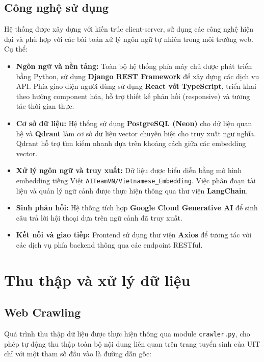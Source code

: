 \subsection{Công nghệ sử dụng}

Hệ thống được xây dựng với kiến trúc client-server, sử dụng các công nghệ hiện đại và phù hợp với các bài toán xử lý ngôn ngữ tự nhiên trong môi trường web. Cụ thể:

\begin{itemize}
    \item \textbf{Ngôn ngữ và nền tảng:} Toàn bộ hệ thống phía máy chủ được phát triển bằng Python, sử dụng \textbf{Django REST Framework} để xây dựng các dịch vụ API. Phía giao diện người dùng sử dụng \textbf{React với TypeScript}, triển khai theo hướng component hóa, hỗ trợ thiết kế phản hồi (responsive) và tương tác thời gian thực.

    \item \textbf{Cơ sở dữ liệu:} Hệ thống sử dụng \textbf{PostgreSQL (Neon)} cho dữ liệu quan hệ và \textbf{Qdrant} làm cơ sở dữ liệu vector chuyên biệt cho truy xuất ngữ nghĩa. Qdrant hỗ trợ tìm kiếm nhanh dựa trên khoảng cách giữa các embedding vector.

    \item \textbf{Xử lý ngôn ngữ và truy xuất:} Dữ liệu được biểu diễn bằng mô hình embedding tiếng Việt \texttt{AITeamVN/Vietnamese\_Embedding}. Việc phân đoạn tài liệu và quản lý ngữ cảnh được thực hiện thông qua thư viện \textbf{LangChain}.

    \item \textbf{Sinh phản hồi:} Hệ thống tích hợp \textbf{Google Cloud Generative AI} để sinh câu trả lời hội thoại dựa trên ngữ cảnh đã truy xuất.

    \item \textbf{Kết nối và giao tiếp:} Frontend sử dụng thư viện \textbf{Axios} để tương tác với các dịch vụ phía backend thông qua các endpoint RESTful.
\end{itemize}

\section{Thu thập và xử lý dữ liệu}

\subsection{Web Crawling}

Quá trình thu thập dữ liệu được thực hiện thông qua module \texttt{crawler.py}, cho phép tự động thu thập toàn bộ nội dung liên quan trên trang tuyển sinh của UIT chỉ với một tham số đầu vào là đường dẫn gốc:

